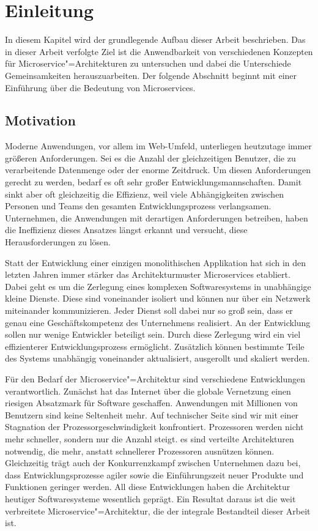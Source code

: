 \chapter{Einleitung}

In diesem Kapitel wird der grundlegende Aufbau dieser Arbeit beschrieben. Das in dieser Arbeit verfolgte Ziel ist die Anwendbarkeit von verschiedenen Konzepten für Microservice"=Architekturen zu untersuchen und dabei die Unterschiede \bzw Gemeinsamkeiten herauszuarbeiten. Der folgende Abschnitt beginnt mit einer Einführung über die Bedeutung von Microservices.

\section{Motivation}

Moderne Anwendungen, vor allem im Web-Umfeld, unterliegen heutzutage immer größeren Anforderungen. Sei es die Anzahl der gleichzeitigen Benutzer, die zu verarbeitende Datenmenge oder der enorme Zeitdruck. Um diesen Anforderungen gerecht zu werden, bedarf es oft sehr großer Entwicklungsmannschaften. Damit sinkt aber oft gleichzeitig die Effizienz, weil viele Abhängigkeiten zwischen Personen und Teams den gesamten Entwicklungsprozess verlangsamen. Unternehmen, die Anwendungen mit derartigen Anforderungen betreiben, haben die Ineffizienz dieses Ansatzes längst erkannt und versucht, diese Herausforderungen zu lösen.

Statt der Entwicklung einer einzigen monolithischen Applikation hat sich in den letzten Jahren immer stärker das Architekturmuster Microservices etabliert. Dabei geht es um die Zerlegung eines komplexen Softwaresystems in unabhängige kleine Dienste. Diese sind voneinander isoliert und können nur über ein Netzwerk miteinander kommunizieren. Jeder Dienst soll dabei nur so groß sein, dass er genau eine Geschäftskompetenz des Unternehmens realisiert. An der Entwicklung sollen nur wenige Entwickler beteiligt sein. Durch diese Zerlegung wird ein viel effizienterer Entwicklungsprozess ermöglicht. Zusätzlich können bestimmte Teile des Systems unabhängig voneinander aktualisiert, ausgerollt und skaliert werden.

Für den Bedarf der Microservice"=Architektur sind verschiedene Entwicklungen verantwortlich. Zunächst hat das Internet über die globale Vernetzung einen riesigen Absatzmark für Software geschaffen. Anwendungen mit Millionen von Benutzern sind keine Seltenheit mehr. Auf technischer Seite sind wir mit einer Stagnation der Prozessorgeschwindigkeit konfrontiert. Prozessoren werden nicht mehr schneller, sondern nur die Anzahl steigt. \Dah es sind verteilte Architekturen notwendig, die mehr, anstatt schnellerer Prozessoren ausnützen können. Gleichzeitig trägt auch der Konkurrenzkampf zwischen Unternehmen dazu bei, dass Entwicklungsprozesse agiler sowie die Einführungszeit neuer Produkte und Funktionen geringer werden. All diese Entwicklungen haben die Architektur heutiger Softwaresysteme wesentlich geprägt. Ein Resultat daraus ist die weit verbreitete Microservice"=Architektur, die der integrale Bestandteil dieser Arbeit ist.

